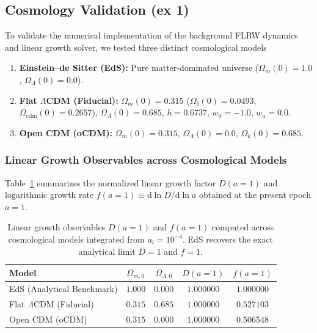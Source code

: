 \subsection{Cosmology Validation (ex 1)}

To validate the numerical implementation of the background FLRW dynamics and linear growth solver, we tested three distinct cosmological models
    \begin{enumerate}
    
        \item \textbf{Einstein--de Sitter (EdS):} Pure matter-dominated universe ($\Omega_{m}(0) = 1.0$, $\Omega_{\Lambda}(0) = 0.0$).
        
        \item \textbf{Flat $\Lambda$CDM (Fiducial):} $\Omega_{m}(0) = 0.315$ ($\Omega_b(0) = 0.0493$, $\Omega_\text{cdm}(0) = 0.2657$), $\Omega_{\Lambda}(0) = 0.685$, $h = 0.6737$, $w_0 = -1.0$, $w_a = 0.0$.
        
        \item \textbf{Open CDM (oCDM):} $\Omega_{m}(0) = 0.315$, $\Omega_{\Lambda}(0) = 0.0$, $\Omega_{k}(0) = 0.685$.
    \end{enumerate}
    
\subsubsection{Linear Growth Observables across Cosmological Models}

Table~\ref{tab:growth_benchmark} summarizes the normalized linear growth factor $D(a=1)$ and logarithmic growth rate $f(a=1) \equiv \mathrm{d}\ln D / \mathrm{d}\ln a$ obtained at the present epoch $a = 1$.

\begin{table}[htbp]
    \centering
    \caption{Linear growth observables $D(a=1)$ and $f(a=1)$ computed across cosmological models integrated from $a_i = 10^{-4}$. EdS recovers the exact analytical limit $D=1$ and $f=1$.}
    \label{tab:growth_benchmark}
    \begin{tabular}{lcccc}
        \hline\hline
        \textbf{Model} & $\Omega_{m,0}$ & $\Omega_{\Lambda,0}$ & $D(a=1)$ & $f(a=1)$ \\
        \hline
        EdS (Analytical Benchmark) & $1.000$ & $0.000$ & $1.000000$ & $1.000000$ \\
        Flat $\Lambda$CDM (Fiducial)  & $0.315$ & $0.685$ & $1.000000$ & $0.527103$ \\
        Open CDM (oCDM)             & $0.315$ & $0.000$ & $1.000000$ & $0.506548$ \\
        \hline\hline
    \end{tabular}
\end{table}

